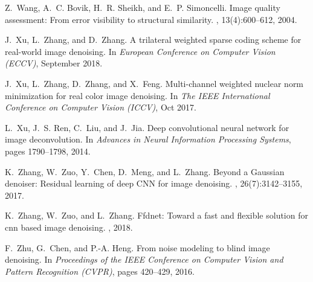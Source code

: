 \documentclass[10pt,twocolumn,letterpaper]{article}
\begin{document}
{\begin{thebibliography}{10}
Z.~Wang, A.~C. Bovik, H.~R. Sheikh, and E.~P. Simoncelli.
\newblock Image quality assessment: {F}rom error visibility to structural
  similarity.
, 13(4):600--612, 2004.

J.~Xu, L.~Zhang, and D.~Zhang.
\newblock A trilateral weighted sparse coding scheme for real-world image
  denoising.
\newblock In {\em European Conference on Computer Vision (ECCV)}, September
  2018.

J.~Xu, L.~Zhang, D.~Zhang, and X.~Feng.
\newblock Multi-channel weighted nuclear norm minimization for real color image
  denoising.
\newblock In {\em The IEEE International Conference on Computer Vision (ICCV)},
  Oct 2017.

L.~Xu, J.~S. Ren, C.~Liu, and J.~Jia.
\newblock Deep convolutional neural network for image deconvolution.
\newblock In {\em Advances in Neural Information Processing Systems}, pages
  1790--1798, 2014.

K.~Zhang, W.~Zuo, Y.~Chen, D.~Meng, and L.~Zhang.
\newblock Beyond a {G}aussian denoiser: {R}esidual learning of deep {CNN} for
  image denoising.
, 26(7):3142--3155, 2017.

K.~Zhang, W.~Zuo, and L.~Zhang.
\newblock Ffdnet: Toward a fast and flexible solution for cnn based image
  denoising.
, 2018.

F.~Zhu, G.~Chen, and P.-A. Heng.
\newblock From noise modeling to blind image denoising.
\newblock In {\em Proceedings of the IEEE Conference on Computer Vision and
  Pattern Recognition (CVPR)}, pages 420--429, 2016.

\end{thebibliography}

}

%
\end{document}
